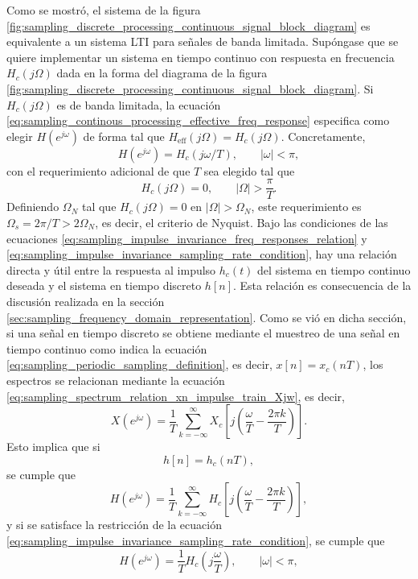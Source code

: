 \documentclass[a4paper]{report}
\begin{document}
Como se mostró, el sistema de la figura \ref{fig:sampling_discrete_processing_continuous_signal_block_diagram} es equivalente a un sistema LTI para señales de banda limitada. Supóngase que se quiere implementar un sistema en tiempo continuo con respuesta en frecuencia \(H_c(j\Omega)\) dada en la forma del diagrama de la figura \ref{fig:sampling_discrete_processing_continuous_signal_block_diagram}. Si \(H_c(j\Omega)\) es de banda limitada, la ecuación \ref{eq:sampling_continous_processing_effective_freq_response} especifica como elegir \(H(e^{j\omega})\) de forma tal que \(H_\textrm{eff}(j\Omega)=H_c(j\Omega)\). Concretamente,
\begin{equation}\label{eq:sampling_impulse_invariance_freq_responses_relation}
 H(e^{j\omega})=H_c(j\omega/T),
 \qquad|\omega|<\pi, 
\end{equation}
con el requerimiento adicional de que \(T\) sea elegido tal que 
\begin{equation}\label{eq:sampling_impulse_invariance_sampling_rate_condition}
 H_c(j\Omega)=0,
 \qquad|\Omega|>\frac{\pi}{T}. 
\end{equation}
Definiendo \(\Omega_N\) tal que \(H_c(j\Omega)=0\) en \(|\Omega|>\Omega_N\), este requerimiento es \(\Omega_s=2\pi/T>2\Omega_N\), es decir, el criterio de Nyquist. Bajo las condiciones de las ecuaciones \ref{eq:sampling_impulse_invariance_freq_responses_relation} y \ref{eq:sampling_impulse_invariance_sampling_rate_condition}, hay una relación directa y útil entre la respuesta al impulso \(h_c(t)\) del sistema en tiempo continuo deseada y el sistema en tiempo discreto \(h[n]\). Esta relación es consecuencia de la discusión realizada en la sección \ref{sec:sampling_frequency_domain_representation}. Como se vió en dicha sección, si una señal en tiempo discreto se obtiene mediante el muestreo de una señal en tiempo continuo como indica la ecuación \ref{eq:sampling_periodic_sampling_definition}, es decir, \(x[n]=x_c(nT)\), los espectros se relacionan mediante la ecuación \ref{eq:sampling_spectrum_relation_xn_impulse_train_Xjw}, es decir,
\[
 X(e^{j\omega})=\frac{1}{T}\sum_{k=-\infty}^{\infty}X_c\left[j\left(\frac{\omega}{T}-\frac{2\pi k}{T}\right)\right].
\]
Esto implica que si
\[
 h[n]=h_c(nT),
\]
se cumple que  
\[
 H(e^{j\omega})=\frac{1}{T}\sum_{k=-\infty}^{\infty}H_c\left[j\left(\frac{\omega}{T}-\frac{2\pi k}{T}\right)\right],
\]
y si se satisface la restricción de la ecuación \ref{eq:sampling_impulse_invariance_sampling_rate_condition}, se cumple que 
\[
 H(e^{j\omega})=\frac{1}{T}H_c\left(j\frac{\omega}{T}\right),
 \qquad|\omega|<\pi,
\]
\end{document}
